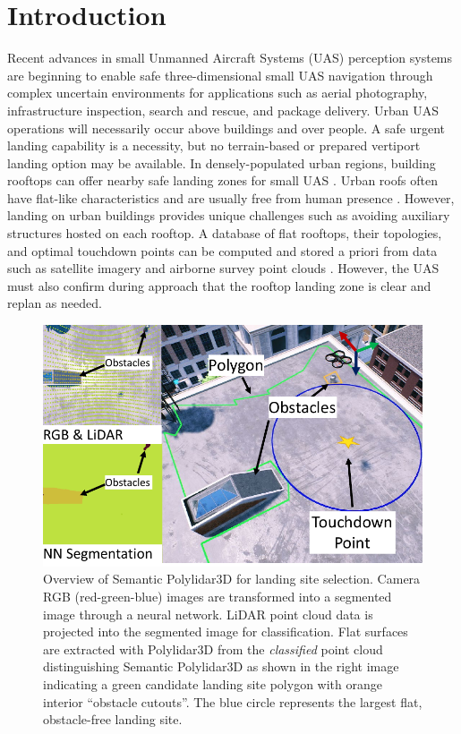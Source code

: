 \section{Introduction}

Recent advances in small Unmanned Aircraft Systems (UAS) perception systems are beginning to enable safe three-dimensional small UAS navigation through complex uncertain environments for applications such as aerial photography, infrastructure inspection, search and rescue, and package delivery. Urban UAS operations will necessarily occur above buildings and over people. A safe urgent landing capability is a necessity, but no terrain-based or prepared vertiport landing option \cite{patterson_timely_2014, atkins_emergency_2006, di_donato_evaluating_2017} may be available.  In densely-populated urban regions, building rooftops can offer nearby safe landing zones for small UAS \cite{desaraju_vision-based_2015}. Urban roofs often have flat-like characteristics and are usually free from human presence \cite{castagno_roof_2018}. However, landing on urban buildings provides unique challenges such as avoiding auxiliary structures hosted on each rooftop.  A database of flat rooftops, their topologies, and optimal touchdown points can be computed and stored a priori from data such as satellite imagery and airborne survey point clouds \cite{castagno_map-based_2021}. However, the UAS must also confirm during approach that the rooftop landing zone is clear and replan as needed. 

\begin{figure}[!ht]
    \centering
    \includegraphics[width=0.75\columnwidth]{chapter_6_landingsim/figs/main_photo.pdf}
    \caption[Overview of Semantic Polylidar3D for real-time landing site selection]{Overview of Semantic Polylidar3D for landing site selection. Camera RGB (red-green-blue) images are transformed into a segmented image through a neural network. LiDAR point cloud data is projected into the segmented image for classification. Flat surfaces are extracted with Polylidar3D \cite{castagno_polylidar3d_2020} from the \textit{classified} point cloud distinguishing Semantic Polylidar3D as shown in the right image indicating a green candidate landing site polygon with orange interior ``obstacle cutouts''. The blue circle represents the largest flat, obstacle-free landing site.}
    \label{fig:ls_overview}
\end{figure}

